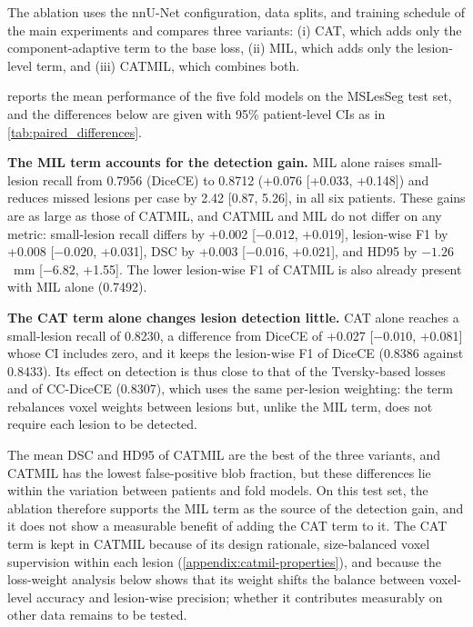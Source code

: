 The ablation uses the nnU-Net configuration, data splits, and training
schedule of the main experiments and compares three variants: (i) CAT,
which adds only the component-adaptive term to the base loss, (ii) MIL,
which adds only the lesion-level term, and (iii) CATMIL, which combines
both.

 reports the mean performance of the five fold
models on the MSLesSeg test set, and the differences below are given with
95\% patient-level CIs as in \cref{tab:paired_differences}.

\textbf{The MIL term accounts for the detection gain.} MIL alone raises
small-lesion recall from 0.7956 (DiceCE) to 0.8712 (+0.076 [+0.033,
+0.148]) and reduces missed lesions per case by 2.42 [0.87, 5.26], in all
six patients. These gains are as large as those of CATMIL, and CATMIL and
MIL do not differ on any metric: small-lesion recall differs by +0.002
[$-0.012$, +0.019], lesion-wise F1 by +0.008 [$-0.020$, +0.031], DSC by
+0.003 [$-0.016$, +0.021], and HD95 by $-1.26$~mm [$-6.82$, +1.55]. The
lower lesion-wise F1 of CATMIL is also already present with MIL alone
(0.7492).

\textbf{The CAT term alone changes lesion detection little.} CAT alone
reaches a small-lesion recall of 0.8230, a difference from DiceCE of
+0.027 [$-0.010$, +0.081] whose CI includes zero, and it keeps the
lesion-wise F1 of DiceCE (0.8386 against 0.8433). Its effect on detection
is thus close to that of the Tversky-based losses and of CC-DiceCE
(0.8307), which uses the same per-lesion weighting: the term rebalances
voxel weights between lesions but, unlike the MIL term, does not require
each lesion to be detected.

The mean DSC and HD95 of CATMIL are the best of the three variants, and
CATMIL has the lowest false-positive blob fraction, but these differences
lie within the variation between patients and fold models. On this test
set, the ablation therefore supports the MIL term as the source of the
detection gain, and it does not show a measurable benefit of adding the
CAT term to it. The CAT term is kept in CATMIL because of its design
rationale, size-balanced voxel supervision within each lesion
(\cref{appendix:catmil-properties}), and because the loss-weight analysis
below shows that its weight shifts the balance between voxel-level accuracy
and lesion-wise precision; whether it contributes measurably on other data
remains to be tested.

